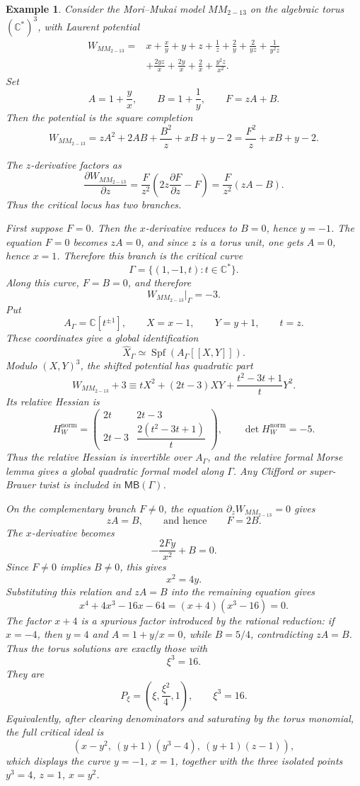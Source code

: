 \documentclass[11pt]{amsart}
\newtheorem{example}{Example}[section]
\newcommand{\MBcat}[1]{\mathsf{MB}(#1)}
\begin{document}
\begin{example}
Consider the Mori--Mukai model $MM_{2-13}$ on the algebraic torus
$(\mathbb{C}^*)^3$, with Laurent potential
\begin{align*}
W_{MM_{2-13}}={}&x+\frac{x}{y}+y+z+\frac{1}{z}+\frac{2}{y}
+\frac{2}{yz}+\frac{1}{y^2z} \\
&+\frac{2yz}{x}+\frac{2y}{x}+\frac{2}{x}+\frac{y^2z}{x^2}.
\end{align*}
Set
\[
A=1+\frac{y}{x},
\qquad
B=1+\frac{1}{y},
\qquad
F=zA+B.
\]
Then the potential is the square completion
\[
W_{MM_{2-13}}
=zA^2+2AB+\frac{B^2}{z}+xB+y-2
=\frac{F^2}{z}+xB+y-2.
\]

The $z$-derivative factors as
\[
\frac{\partial W_{MM_{2-13}}}{\partial z}
=\frac{F}{z^2}\left(2z\frac{\partial F}{\partial z}-F\right)
=\frac{F}{z^2}\left(zA-B\right).
\]
Thus the critical locus has two branches.

First suppose $F=0$. Then the $x$-derivative reduces to $B=0$, hence
$y=-1$. The equation $F=0$ becomes $zA=0$, and since $z$ is a torus unit, one
gets $A=0$, hence $x=1$. Therefore this branch is the critical curve
\[
\Gamma=\{(1,-1,t):t\in\mathbb{C}^*\}.
\]
Along this curve, $F=B=0$, and therefore
\[
W_{MM_{2-13}}|_{\Gamma}=-3.
\]
Put
\[
A_{\Gamma}=\mathbb C[t^{\pm1}],
\qquad
X=x-1,
\qquad
Y=y+1,
\qquad
t=z.
\]
These coordinates give a global identification
\[
\widehat X_{\Gamma}\simeq\operatorname{Spf}(A_{\Gamma}[[X,Y]]).
\]
Modulo $(X,Y)^3$, the shifted potential has quadratic part
\[
W_{MM_{2-13}}+3\equiv
tX^2+(2t-3)XY+\frac{t^2-3t+1}{t}Y^2.
\]
Its relative Hessian is
\[
H_W^{\mathrm{norm}}=
\begin{pmatrix}
2t & 2t-3\\
2t-3 & \dfrac{2(t^2-3t+1)}{t}
\end{pmatrix},
\qquad
\det H_W^{\mathrm{norm}}=-5.
\]
Thus the relative Hessian is invertible over $A_{\Gamma}$, and the relative
formal Morse lemma gives a global quadratic formal model along $\Gamma$. Any
Clifford or super-Brauer twist is included in $\MBcat{\Gamma}$.

On the complementary branch $F\neq0$, the equation
$\partial_zW_{MM_{2-13}}=0$ gives
\[
zA=B,
\qquad\text{and hence}\qquad
F=2B.
\]
The $x$-derivative becomes
\[
-\frac{2Fy}{x^2}+B=0.
\]
Since $F\neq0$ implies $B\neq0$, this gives
\[
x^2=4y.
\]
Substituting this relation and $zA=B$ into the remaining equation gives
\[
x^4+4x^3-16x-64=(x+4)(x^3-16)=0.
\]
The factor $x+4$ is a spurious factor introduced by the rational reduction:
if $x=-4$, then $y=4$ and $A=1+y/x=0$, while $B=5/4$, contradicting
$zA=B$. Thus the torus solutions are exactly those with
\[
\xi^3=16.
\]
They are
\[
P_{\xi}=\left(\xi,\frac{\xi^2}{4},1\right),
\qquad
\xi^3=16.
\]
Equivalently, after clearing denominators and saturating by the torus monomial,
the full critical ideal is
\[
\left(x-y^2,\ (y+1)(y^3-4),\ (y+1)(z-1)\right),
\]
which displays the curve $y=-1$, $x=1$, together with the three isolated points
$y^3=4$, $z=1$, $x=y^2$.


\end{example}
\end{document}

